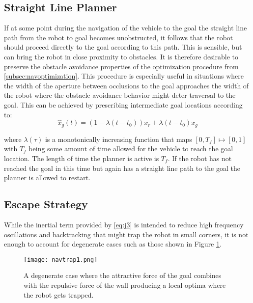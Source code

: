 \subsection{Straight Line Planner}

If at some point during the navigation of the vehicle to the goal the straight line path from the robot to goal becomes
unobstructed, it follows that the robot should proceed directly to the goal according to this path. This is sensible, but
can bring the robot in close proximity to obstacles. It is therefore desirable to preserve the obstacle avoidance properties
of the optimization procedure from \ref{subsec:navoptimization}. This procedure is especially useful in situations where the width of the aperture between 
occlusions to the goal approaches the width of the robot where the obstacle avoidance behavior might deter traversal to the goal. 
This can be achieved by prescribing intermediate goal locations
according to:
\begin{equation}
	\hat x_g(t) = (1 - \lambda(t - t_0)) x_r + \lambda (t - t_0) x_g
\label{eq:line_path1}
\end{equation}

where $\lambda(\tau)$ is a monotonically increasing function that maps $[0, T_f] \mapsto [0,1]$ with $T_f$ being some 
amount of time allowed for the vehicle to reach the goal location. The length of time the planner is active is $T_f$.
If the robot has not reached the goal in this time but again has a straight line path to the goal the planner is allowed
to restart.

\subsection{Escape Strategy} \label{subsec:escape_strategy}

While the inertial term provided by \ref{eq:j3} is intended to reduce high frequency oscillations and backtracking that might
trap the robot in small corners, it is not enough to account for degenerate cases such as those shown in Figure \ref{fig:trap1}.

\begin{figure}
	\centering
	\texttt{[image: navtrap1.png]}
	\caption
	{A degenerate case where the attractive force of the goal combines with the repulsive force of the wall producing a local optima
	where the robot gets trapped.}
	\label{fig:trap1}
\end{figure}

